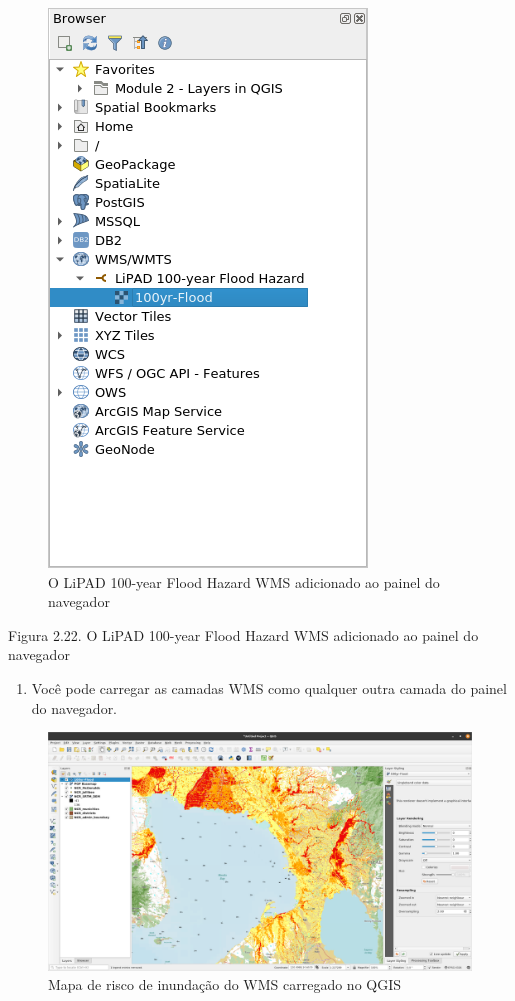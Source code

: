 \documentclass[
]{book}
\providecommand{\tightlist}{%
  \setlength{\itemsep}{0pt}\setlength{\parskip}{0pt}}
\begin{document}
\begin{figure}
\centering
\includegraphics{media/modulo2/wms-2.png}
\caption{O LiPAD 100-year Flood Hazard WMS adicionado ao painel do navegador}
\end{figure}

Figura 2.22. O LiPAD 100-year Flood Hazard WMS adicionado ao painel do navegador

\begin{enumerate}
\def\labelenumi{\arabic{enumi}.}
\setcounter{enumi}{5}
\tightlist
\item
  Você pode carregar as camadas WMS como qualquer outra camada do painel do navegador.
\end{enumerate}

\begin{figure}
\centering
\includegraphics{media/modulo2/wms-3.png}
\caption{Mapa de risco de inundação do WMS carregado no QGIS}
\end{figure}
\end{document}
